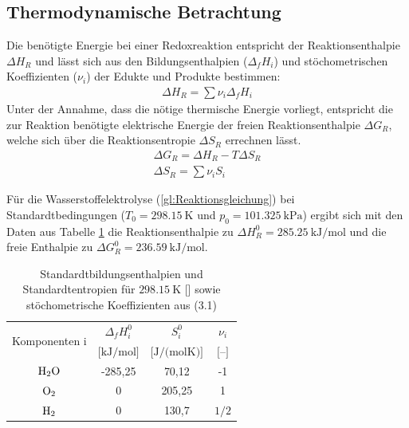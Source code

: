 \subsection{Thermodynamische Betrachtung}
\label{subsec:Energetische Betrachtung der Wasserelektrolyse}
Die benötigte Energie bei einer Redoxreaktion entspricht der Reaktionsenthalpie $\Delta H_R$ und lässt sich aus den Bildungsenthalpien ($\Delta_f H_i$) und stöchometrischen Koeffizienten ($\nu_i$) der Edukte und Produkte bestimmen:
\begin{align}
 	\Delta H_R = \sum{\nu_i \Delta_f H_i}
\end{align}
Unter der Annahme, dass die nötige thermische Energie vorliegt, entspricht die zur Reaktion benötigte elektrische Energie  der freien Reaktionsenthalpie $\Delta G_R$, welche sich über die Reaktionsentropie $\Delta S_R$ errechnen lässt.
\begin{align}
	\Delta G_R = \Delta H_R - T\Delta S_R \\
 	\Delta S_R = \sum{\nu_i S_i}
\end{align}

Für die Wasserstoffelektrolyse (\ref{gl:Reaktionsgleichung}) bei Standardtbedingungen ($T_0 = \SI{298,15}{\kelvin}$ und $p_0 = \SI{101,325}{\kilo\pascal}$) ergibt sich mit den Daten aus Tabelle \ref{tb:Stoffdaten} die Reaktionsenthalpie zu $\Delta H^0_R = \SI{285,25}{\kilo\J\per\mol}$ und die freie Enthalpie zu $\Delta G^0_R = \SI{236,59}{\kilo\J\per\mol}$. 
\begin{table}[ht]
		\centering
		\caption{Standardtbildungsenthalpien und Standardtentropien für $\SI{298,15}{\kelvin}$ [\cite{?%
		}] sowie stöchometrische Koeffizienten aus (3.1)}
		\begin{tabular}{c c c c}
		\toprule
		\multirow{2}{*}{Komponenten i} & 
		\multicolumn{1}{c}{$\Delta_f H^0_i$} & 
		\multicolumn{1}{c}{$S^0_i$} &
		\multicolumn{1}{c}{$\nu_i$}
		\\
		& 
		\multicolumn{1}{c}{$\textrm{[kJ/mol]}$}& 
		\multicolumn{1}{c}{$\textrm{[J/(molK)]}$} &
		\multicolumn{1}{c}{$\textrm{[--]}$}
		\\
		\midrule
		$\ce{H2O}$ & -285,25 & 70,12 & -1\\
		$\ce{O2}$ & 0 & 205,25 & 1\\
		$\ce{H2}$ & 0 & 130,7 & $\textrm{1/2}$\\
		\bottomrule
		\end{tabular}
		\label{tb:Stoffdaten}
		\end{table}	
			
